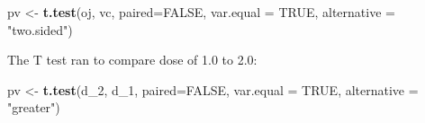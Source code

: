 \documentclass[]{article}
\newenvironment{Shaded}{\begin{snugshade}}{\end{snugshade}}
\newcommand{\KeywordTok}[1]{\textcolor[rgb]{0.13,0.29,0.53}{\textbf{{#1}}}}
\newcommand{\DataTypeTok}[1]{\textcolor[rgb]{0.13,0.29,0.53}{{#1}}}
\newcommand{\StringTok}[1]{\textcolor[rgb]{0.31,0.60,0.02}{{#1}}}
\newcommand{\OtherTok}[1]{\textcolor[rgb]{0.56,0.35,0.01}{{#1}}}
\newcommand{\NormalTok}[1]{{#1}}
\begin{document}
\begin{Shaded}
\begin{Highlighting}[]
\NormalTok{pv <-}\StringTok{ }\KeywordTok{t.test}\NormalTok{(oj, vc, }\DataTypeTok{paired=}\OtherTok{FALSE}\NormalTok{, }\DataTypeTok{var.equal =} \OtherTok{TRUE}\NormalTok{, }\DataTypeTok{alternative =} \StringTok{"two.sided"}\NormalTok{)}
\end{Highlighting}
\end{Shaded}

The T test ran to compare dose of 1.0 to 2.0:

\begin{Shaded}
\begin{Highlighting}[]
\NormalTok{pv <-}\StringTok{ }\KeywordTok{t.test}\NormalTok{(d_2, d_1, }\DataTypeTok{paired=}\OtherTok{FALSE}\NormalTok{, }\DataTypeTok{var.equal =} \OtherTok{TRUE}\NormalTok{, }\DataTypeTok{alternative =} \StringTok{"greater"}\NormalTok{)}
\end{Highlighting}
\end{Shaded}
\end{document}
